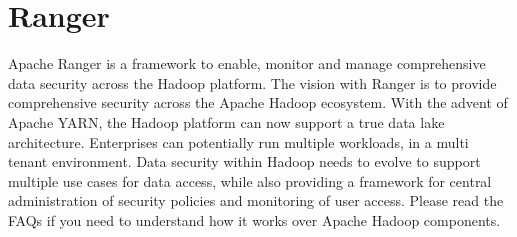 \section{Ranger}

Apache Ranger\cite{hip-sp18-515-www-ranger} is a framework to enable, 
monitor and manage comprehensive data security across the Hadoop 
platform.
The vision with Ranger is to provide comprehensive security across 
the Apache Hadoop ecosystem. With the advent of Apache YARN, the 
Hadoop platform can now support a true data lake architecture. 
Enterprises can potentially run multiple workloads, in a multi 
tenant environment. Data security within Hadoop needs to evolve 
to support multiple use cases for data access, while also providing 
a framework for central administration of security policies and 
monitoring of user access.
Please read the FAQs if you need to understand how it works over 
Apache Hadoop components.
